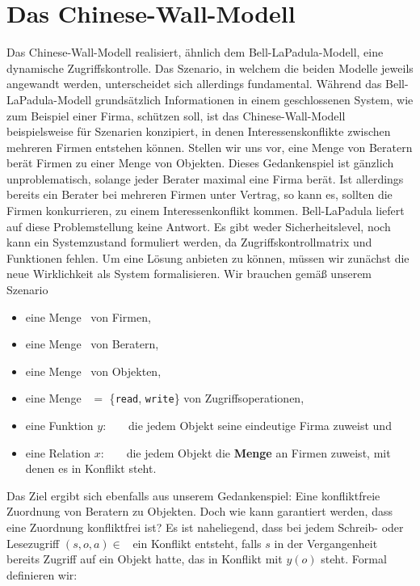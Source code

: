\section{Das Chinese-Wall-Modell}
Das Chinese-Wall-Modell realisiert, ähnlich dem Bell-LaPadula-Modell, eine dynamische Zugriffskontrolle. Das Szenario, in welchem die beiden Modelle jeweils angewandt werden, unterscheidet sich allerdings fundamental.
Während das Bell-LaPadula-Modell grundsätzlich Informationen in einem geschlossenen System, wie zum Beispiel einer Firma, schützen soll, ist das Chinese-Wall-Modell beispielsweise für Szenarien konzipiert, in denen Interessenskonflikte zwischen mehreren Firmen entstehen können.
Stellen wir uns vor, eine Menge von Beratern berät Firmen zu einer Menge von Objekten. Dieses Gedankenspiel ist gänzlich unproblematisch, solange jeder Berater maximal eine Firma berät. Ist allerdings bereits ein Berater bei mehreren Firmen unter Vertrag, so kann es, sollten die Firmen konkurrieren, zu einem Interessenkonflikt kommen. Bell-LaPadula liefert auf diese Problemstellung keine Antwort. Es gibt weder Sicherheitslevel, noch kann ein Systemzustand formuliert werden, da Zugriffskontrollmatrix und Funktionen fehlen.
Um eine Lösung anbieten zu können, müssen wir zunächst die neue Wirklichkeit als System formalisieren. Wir brauchen gemäß unserem Szenario

\begin{itemize}
	\item eine Menge \calC\ von Firmen,
	\item eine Menge \calS\ von Beratern,
	\item eine Menge \calO\ von Objekten,
	\item eine Menge \calA\ \(=\) \{\texttt{read}, \texttt{write}\} von Zugriffsoperationen, 
	\item eine Funktion \(y:\) \calO\ \rArrow\ \calC\, die jedem Objekt seine eindeutige Firma zuweist und
	\item eine Relation \(x:\) \calO\ \rArrow\ \calC\, die jedem Objekt die \textbf{Menge} an Firmen zuweist, mit denen es in Konflikt steht.
\end{itemize}

Das Ziel ergibt sich ebenfalls aus unserem Gedankenspiel: Eine konfliktfreie Zuordnung von Beratern zu Objekten. Doch wie kann garantiert werden, dass eine Zuordnung konfliktfrei ist? %
Es ist naheliegend, dass bei jedem Schreib- oder Lesezugriff \((s, o, a) \in\) \calS \ctsProd \calO \ctsProd \calA\ ein Konflikt entsteht, falls \(s\) in der Vergangenheit bereits Zugriff auf ein Objekt hatte, das in Konflikt mit \(y(o)\) steht. Formal definieren wir: 

